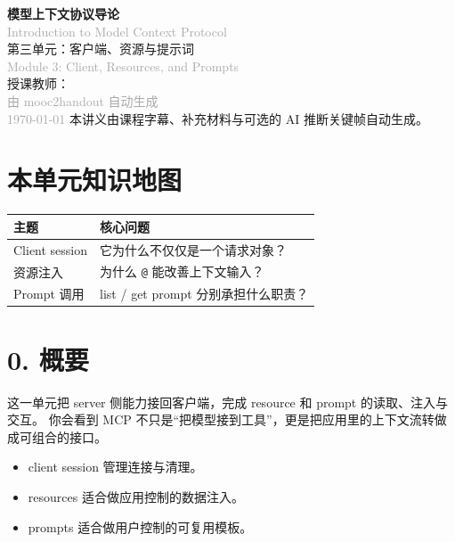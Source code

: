 \documentclass[UTF8,a4paper,11pt]{ctexart}
\begin{document}
\begin{center}
  \vspace*{2cm}
  {\Huge\bfseries\color{accent} 模型上下文协议导论}\\[0.3cm]
  {\small\textcolor{darkgray}{Introduction to Model Context Protocol}}\\[0.8cm]
  {\LARGE 第三单元：客户端、资源与提示词}\\[0.3cm]
  {\small\textcolor{darkgray}{Module 3: Client, Resources, and Prompts}}\\[1.2cm]
  {\large 授课教师： }\\[0.5cm]
  {\large\textcolor{darkgray}{由 mooc2handout 自动生成}}\\[0.3cm]
  {\small\textcolor{darkgray}{\today}}
  \vfill
  {\small 本讲义由课程字幕、补充材料与可选的 AI 推断关键帧自动生成。}
\end{center}
\newpage

\tableofcontents
\newpage

\section*{本单元知识地图}
\begin{longtable}{p{3.1cm}p{10.2cm}}
\toprule
主题 & 核心问题 \\
\midrule
Client session & 它为什么不仅仅是一个请求对象？ \\
资源注入 & 为什么 \texttt{@} 能改善上下文输入？ \\
Prompt 调用 & list / get prompt 分别承担什么职责？ \\
\bottomrule
\end{longtable}

\section*{0. 概要}
这一单元把 server 侧能力接回客户端，完成 resource 和 prompt 的读取、注入与交互。
你会看到 MCP 不只是“把模型接到工具”，更是把应用里的上下文流转做成可组合的接口。

\begin{itemize}
  \item client session 管理连接与清理。
  \item resources 适合做应用控制的数据注入。
  \item prompts 适合做用户控制的可复用模板。
\end{itemize}
\end{document}
